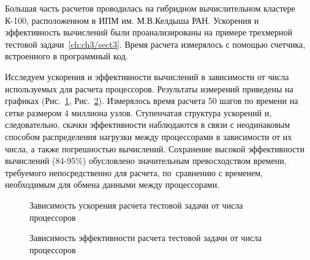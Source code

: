 Большая часть расчетов проводилась на гибридном вычислительном кластере К-100, расположенном в ИПМ им. М.В.Келдыша РАН.
Ускорения и эффективность вычислений были проанализированы на примере трехмерной тестовой задачи~\ref{ch:ch3/sect3}.
Время расчета измерялось с помощью счетчика, встроенного в программный код.

Исследуем ускорения и эффективности вычислений в зависимости от числа
используемых для расчета процессоров. Результаты измерений приведены
на графиках (Рис.~\ref{mpi_speedup}, Рис.~\ref{mpi_eff}).
Измерялось время расчета 50 шагов по времени на сетке размером 4 миллиона узлов.
Ступенчатая структура ускорений и, следовательно, скачки эффективности наблюдаются
в связи с неодинаковым способом распределения нагрузки между процессорами
в зависимости от их числа, а также погрешностью вычислений. Сохранение высокой
эффективности вычислений (84-95\%) обусловлено значительным превосходством времени, требуемого
непосредственно для расчета, по~сравнению с временем, необходимым для обмена данными
между процессорами.

\begin{figure}[!h]
\begin{center}
\caption{Зависимость ускорения расчета тестовой задачи от числа процессоров}
\label{mpi_speedup}
\end{center}
\end{figure}

\begin{figure}[!h]
\begin{center}
\caption{Зависимость эффективности расчета тестовой задачи от числа процессоров}
\label{mpi_eff}
\end{center}
\end{figure}

